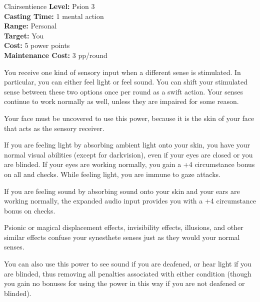 {Clairsentience}
{
	\textbf{Level:}
	Psion 3\\
	\textbf{Casting Time:}
	1 mental action\\
	\textbf{Range:}
	Personal\\
	\textbf{Target:}
	You\\
	\textbf{Cost:}
	5 power points\\
	\textbf{Maintenance Cost:}
	3 pp/round\\
}
{
	You receive one kind of sensory input when a different sense is stimulated. In particular, you can either feel light or feel sound. You can shift your stimulated sense between these two options once per round as a swift action. Your senses continue to work normally as well, unless they are impaired for some reason.

	Your face must be uncovered to use this power, because it is the skin of your face that acts as the sensory receiver.

	If you are feeling light by absorbing ambient light onto your skin, you have your normal visual abilities (except for darkvision), even if your eyes are closed or you are blinded. If your eyes are working normally, you gain a +4 circumstance bonus on all  and  checks. While feeling light, you are immune to gaze attacks.

	If you are feeling sound by absorbing sound onto your skin and your ears are working normally, the expanded audio input provides you with a +4 circumstance bonus on  checks.

	Psionic or magical displacement effects, invisibility effects, illusions, and other similar effects confuse your synesthete senses just as they would your normal senses.

	You can also use this power to see sound if you are deafened, or hear light if you are blinded, thus removing all penalties associated with either condition (though you gain no bonuses for using the power in this way if you are not deafened or blinded).
}